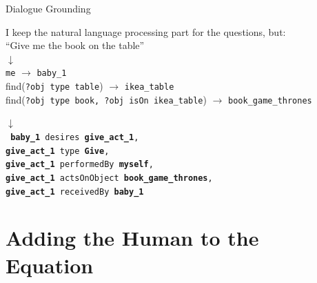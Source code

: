 \documentclass[compress]{beamer}
\begin{document}
{
\begin{frame}{Dialogue Grounding}
    \centering

    I keep the natural language processing part for the questions, but:\\

    \vspace*{2em}
    ``Give me the book on the table''\\

     {
        $\downarrow$\\
        {\tt me} $\rightarrow$ {\tt baby\_1} \\
        find({\tt\scriptsize ?obj type table}) $\rightarrow$ {\tt ikea\_table} \\
        find({\tt\scriptsize ?obj type book, ?obj isOn ikea\_table})
        $\rightarrow$ {\tt book\_game\_thrones} \\
    }

     {
        $\downarrow$\\
        { \tt
            \textbf{baby\_1} desires \textbf{give\_act\_1}, \\
            \textbf{give\_act\_1} type \textbf{Give}, \\
            \textbf{give\_act\_1} performedBy \textbf{myself}, \\
            \textbf{give\_act\_1} actsOnObject \textbf{book\_game\_thrones}, \\
            \textbf{give\_act\_1} receivedBy \textbf{baby\_1} \\
        }
    }
\end{frame}
}







\section{Adding the Human to the Equation}

\end{document}
